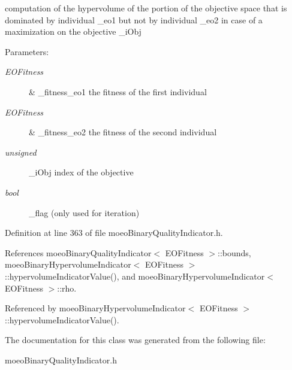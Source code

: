 computation of the hypervolume of the portion of the objective space that is dominated by individual \_\-eo1 but not by individual \_\-eo2 in case of a maximization on the objective \_\-i\-Obj 

\begin{Desc}
\item[Parameters:]
\begin{description}
\item[{\em EOFitness}]\& \_\-fitness\_\-eo1 the fitness of the first individual \item[{\em EOFitness}]\& \_\-fitness\_\-eo2 the fitness of the second individual \item[{\em unsigned}]\_\-i\-Obj index of the objective \item[{\em bool}]\_\-flag (only used for iteration) \end{description}
\end{Desc}


Definition at line 363 of file moeo\-Binary\-Quality\-Indicator.h.

References moeo\-Binary\-Quality\-Indicator$<$ EOFitness $>$::bounds, moeo\-Binary\-Hypervolume\-Indicator$<$ EOFitness $>$::hypervolume\-Indicator\-Value(), and moeo\-Binary\-Hypervolume\-Indicator$<$ EOFitness $>$::rho.

Referenced by moeo\-Binary\-Hypervolume\-Indicator$<$ EOFitness $>$::hypervolume\-Indicator\-Value().

The documentation for this class was generated from the following file:\begin{CompactItemize}
\item 
moeo\-Binary\-Quality\-Indicator.h\end{CompactItemize}
